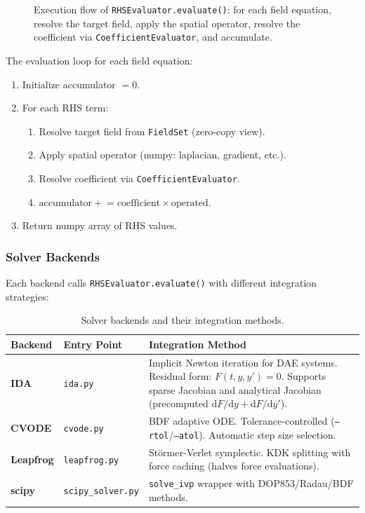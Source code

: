 \begin{figure}[htbp]
\centering

\caption{Execution flow of \texttt{RHSEvaluator.evaluate()}: for each field equation, resolve the target field, apply the spatial operator, resolve the coefficient via \texttt{CoefficientEvaluator}, and accumulate.}
\label{fig:solver-flowchart}
\end{figure}

The evaluation loop for each field equation:
\begin{enumerate}
  \item Initialize accumulator $= 0$.
  \item For each RHS term:
  \begin{enumerate}
    \item Resolve target field from \texttt{FieldSet} (zero-copy view).
    \item Apply spatial operator (numpy: laplacian, gradient, etc.).
    \item Resolve coefficient via \texttt{CoefficientEvaluator}.
    \item $\text{accumulator} \mathrel{+}= \text{coefficient} \times \text{operated}$.
  \end{enumerate}
  \item Return numpy array of RHS values.
\end{enumerate}

\subsubsection{Solver Backends}
\label{sec:solver-backends}

Each backend calls \texttt{RHSEvaluator.evaluate()} with different integration strategies:

\begin{table}[htbp]
\centering
\caption{Solver backends and their integration methods.}
\label{tab:solver-backends}
\begin{tabular}{@{}lll@{}}
\toprule
Backend & Entry Point & Integration Method \\
\midrule
\textbf{IDA} & \texttt{ida.py} & Implicit Newton iteration for DAE systems. Residual form: $F(t, y, y') = 0$. Supports sparse Jacobian and analytical Jacobian (precomputed $\mathrm{d}F/\mathrm{d}y + \mathrm{d}F/\mathrm{d}y'$). \\
\textbf{CVODE} & \texttt{cvode.py} & BDF adaptive ODE. Tolerance-controlled (\texttt{--rtol}/\texttt{--atol}). Automatic step size selection. \\
\textbf{Leapfrog} & \texttt{leapfrog.py} & St\"ormer-Verlet symplectic. KDK splitting with force caching (halves force evaluations). \\
\textbf{scipy} & \texttt{scipy\_solver.py} & \texttt{solve\_ivp} wrapper with DOP853/Radau/BDF methods. \\
\bottomrule
\end{tabular}
\end{table}

